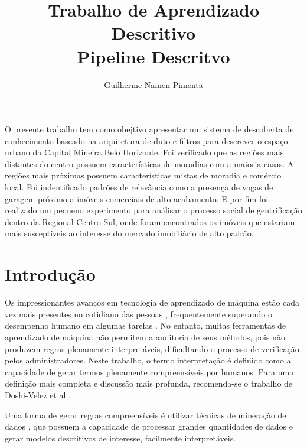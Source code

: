\documentclass[12pt]{article}
\title{Trabalho de Aprendizado Descritivo\\ Pipeline Descritvo}
\author{Guilherme Namen Pimenta\inst{1} }
\begin{document}
 

\maketitle

  
     
\begin{resumo} 
O presente trabalho tem como obejtivo apresentar um sistema de descoberta de conhecimento baseado na arquitetura de duto e filtros para descrever o espaço urbano da Capital Mineira Belo Horizonte. Foi verificado que as regiões mais distantes do centro possuem características de moradias com a maioria casas. A regiões mais próximas possuem características mistas de moradia e comércio local. Foi indentificado padrões de relevância como a presença de vagas de garagem próximo a imóveis comerciais de alto acabamento. E por fim foi realizado um pequeno experimento para análisar o processo social de gentrificação dentro da Regional Centro-Sul, onde foram encontrados os imóveis que estariam mais susceptíveis ao interesse do mercado imobiliário de alto padrão. 
\end{resumo}


\section{Introdução}

Os impressionantes avanços em tecnologia de aprendizado de máquina estão cada vez mais presentes no cotidiano das pessoas \cite{doshi2017towards}, frequentemente superando o desempenho humano em algumas tarefas \cite{silver2016mastering}. No entanto, muitas ferramentas de aprendizado de máquina não permitem a auditoria de seus métodos, pois não produzem regras plenamente interpretáveis, dificultando o processo de verificação pelos administradores. Neste trabalho, o termo interpretação é definido como a capacidade de gerar termos plenamente compreensíveis por humanos. Para uma definição mais completa e discussão mais profunda, recomenda-se o trabalho de Doshi-Velez et al \cite{doshi2017towards}. 

Uma forma de gerar regras compreensíveis é utilizar técnicas de mineração de dados \cite{zaki2014data}, que possuem a capacidade de processar grandes quantidades de dados e gerar modelos descritivos de interesse, facilmente interpretáveis. 
\end{document}

